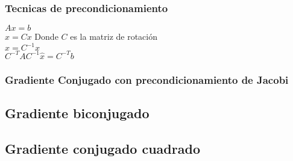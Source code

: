 \subsubsection*{Tecnicas de precondicionamiento}

$Ax=b$\\
$\hat{x}=Cx$ Donde $C$ es la matriz de rotaci\'on \\
$x=C^{-1}\hat{x}$\\
$C^{-T}AC^{-1}\hat{x}=C^{-T}b$

\subsubsection{Gradiente Conjugado con precondicionamiento de Jacobi}
\subsection{Gradiente biconjugado}
\subsection{Gradiente conjugado cuadrado}
